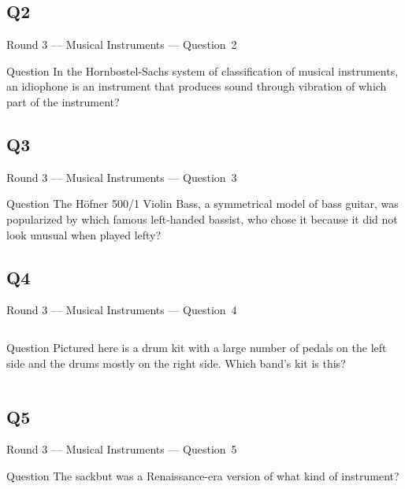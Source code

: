 \documentclass[11pt]{beamer}
\begin{document}
\subsection*{Q2}
\begin{frame}[t]{Round 3 --- Musical Instruments --- \mbox{Question 2}}
\vspace{-0.5em}
\begin{block}{Question}
In the Hornbostel-Sachs system of classification of musical instruments, an idiophone is an instrument that produces sound through vibration of which part of the instrument?
\end{block}
\end{frame}
\subsection*{Q3}
\begin{frame}[t]{Round 3 --- Musical Instruments --- \mbox{Question 3}}
\vspace{-0.5em}
\begin{block}{Question}
The Höfner 500/1 Violin Bass, a symmetrical model of bass guitar, was popularized by which famous left-handed bassist, who chose it because it did not look unusual when played lefty?
\end{block}
\end{frame}
\subsection*{Q4}
\begin{frame}[t]{Round 3 --- Musical Instruments --- \mbox{Question 4}}
\vspace{-0.5em}
\begin{columns}[T,totalwidth=\linewidth]
\begin{column}{0.32\linewidth}
\begin{block}{Question}
Pictured here is a drum kit with a large number of pedals on the left side and the drums mostly on the right side. Which band's kit is this? 
\end{block}
\end{column}
\begin{column}{0.65\linewidth}
\begin{center}
\texttt{[image: \{Images/defleppard]}.jpg}
\end{center}
\end{column}
\end{columns}
\end{frame}
\subsection*{Q5}
\begin{frame}[t]{Round 3 --- Musical Instruments --- \mbox{Question 5}}
\vspace{-0.5em}
\begin{block}{Question}
The sackbut was a Renaissance-era version of what kind of instrument?
\end{block}
\end{frame}
\end{document}

